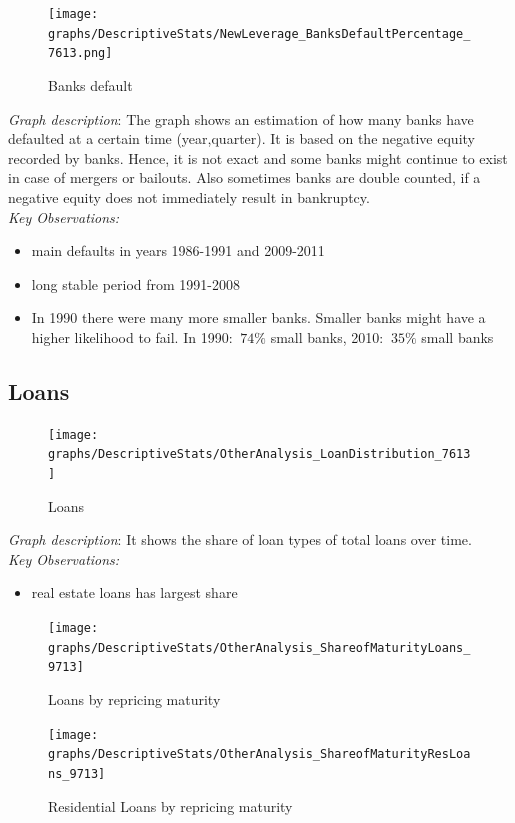\documentclass[12pt, a4paper]{article} %
\begin{document}
\newpage


\begin{figure}[hbtp]
\centering
\caption{Banks default}
\texttt{[image: graphs/DescriptiveStats/NewLeverage\_BanksDefaultPercentage\_7613.png]}
\end{figure}

\noindent \textit{Graph description}: The graph shows an estimation of how many banks have defaulted at a certain time (year,quarter). It is based on the negative equity recorded by banks. Hence, it is not exact and some banks might continue to exist in case of mergers or bailouts. Also sometimes banks are double counted, if a negative equity does not immediately result in bankruptcy. \\
\noindent \textit{Key Observations:}
\begin{itemize}
\item main defaults in years 1986-1991 and 2009-2011
\item long stable period from 1991-2008
\item In 1990 there were many more smaller banks. Smaller banks might have a higher likelihood to fail. In 1990:  $~74\%$ small banks, 2010: $~35\%$ small banks 
\end{itemize}


\subsection{Loans}

\begin{figure}[hbtp]
\centering
\caption{Loans}
\texttt{[image: graphs/DescriptiveStats/OtherAnalysis\_LoanDistribution\_7613]}
\end{figure}

\noindent \textit{Graph description}: It shows the share of loan types of total loans over time.\\

\noindent \textit{Key Observations:}
\begin{itemize}
\item real estate loans has largest share

\end{itemize}

\begin{figure}[hbtp]
\centering
\caption{Loans by repricing maturity}
\texttt{[image: graphs/DescriptiveStats/OtherAnalysis\_ShareofMaturityLoans\_9713]}
\end{figure}


\begin{figure}[hbtp]
\centering
\caption{Residential Loans by repricing maturity}
\texttt{[image: graphs/DescriptiveStats/OtherAnalysis\_ShareofMaturityResLoans\_9713]}
\end{figure}
\end{document}

